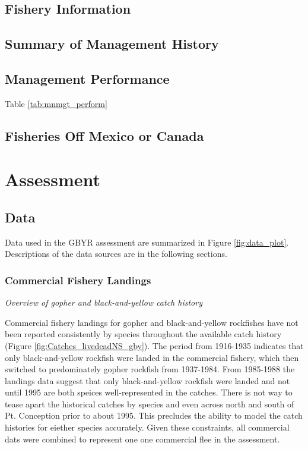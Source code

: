\documentclass[12pt,]{article}
\begin{document}
\subsection{Fishery Information}\label{fishery-information}

\subsection{Summary of Management
History}\label{summary-of-management-history}

\subsection{Management Performance}\label{management-performance-1}

Table \ref{tab:mnmgt_perform}

\subsection{Fisheries Off Mexico or
Canada}\label{fisheries-off-mexico-or-canada}

\section{Assessment}\label{assessment}

\subsection{Data}\label{data}

Data used in the GBYR assessment are summarized in Figure
\ref{fig:data_plot}. Descriptions of the data sources are in the
following sections.

\subsubsection{Commercial Fishery
Landings}\label{commercial-fishery-landings}

\emph{Overview of gopher and black-and-yellow catch history}

Commercial fishery landings for gopher and black-and-yellow rockfishes
have not been reported consistently by species throughout the available
catch history (Figure \ref{fig:Catches_livedeadNS_gby}). The period from
1916-1935 indicates that only black-and-yellow rockfish were landed in
the commercial fishery, which then switched to predominately gopher
rockfish from 1937-1984. From 1985-1988 the landings data suggest that
only black-and-yellow rockfish were landed and not until 1995 are both
speices well-represented in the catches. There is not way to tease apart
the historical catches by species and even across north and south of Pt.
Conception prior to about 1995. This precludes the ability to model the
catch histories for eiether species accurately. Given these constraints,
all commercial dats were combined to represent one one commercial flee
in the assessment.
\end{document}
